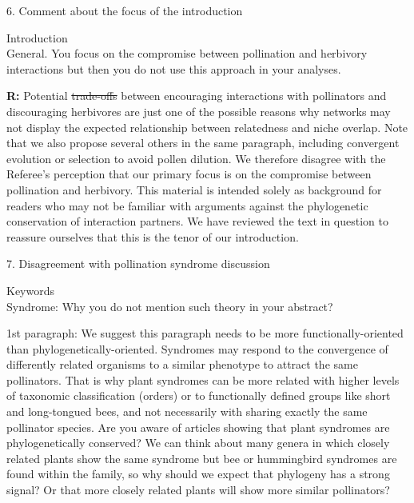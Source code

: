 \documentclass[12pt]{letter}
\newenvironment{refquote}{\bigskip \begin{it}}{\end{it}\smallskip}
\providecommand{\DIFadd}[1]{{\protect\color{blue}\uwave{#1}}} %
\providecommand{\DIFdel}[1]{{\protect\color{red}\sout{#1}}}                      %
\providecommand{\DIFaddbegin}{} %
\providecommand{\DIFaddend}{} %
\providecommand{\DIFdelbegin}{} %
\providecommand{\DIFdelend}{} %
\newcommand{\DIFscaledelfig}{0.5}
\newlength{\DIFdelgraphicswidth} %
\newlength{\DIFdelgraphicsheight} %
\newcommand{\DIFaddincludegraphics}[2][]{{\color{blue}\fbox{\DIFOincludegraphics[#1]{#2}}}} %
\newcommand{\DIFdelincludegraphics}[2][]{%
\sbox{\DIFdelgraphicsbox}{\DIFOincludegraphics[#1]{#2}}%
\settoboxwidth{\DIFdelgraphicswidth}{\DIFdelgraphicsbox} %
\settoboxtotalheight{\DIFdelgraphicsheight}{\DIFdelgraphicsbox} %
\scalebox{\DIFscaledelfig}{%
\parbox[b]{\DIFdelgraphicswidth}{\usebox{\DIFdelgraphicsbox}\\[-\baselineskip] \rule{\DIFdelgraphicswidth}{0em}}\llap{\resizebox{\DIFdelgraphicswidth}{\DIFdelgraphicsheight}{%
\setlength{\unitlength}{\DIFdelgraphicswidth}%
\begin{picture}(1,1)%
\thicklines\linethickness{2pt} %
{\color[rgb]{1,0,0}\put(0,0){\framebox(1,1){}}}%
{\color[rgb]{1,0,0}\put(0,0){\line( 1,1){1}}}%
{\color[rgb]{1,0,0}\put(0,1){\line(1,-1){1}}}%
\end{picture}%
}\hspace*{3pt}}} %
} %
\DeclareRobustCommand{\DIFaddbegin}{\DIFOaddbegin \let\includegraphics\DIFaddincludegraphics} %
\DeclareRobustCommand{\DIFaddend}{\DIFOaddend \let\includegraphics\DIFOincludegraphics} %
\DeclareRobustCommand{\DIFdelbegin}{\DIFOdelbegin \let\includegraphics\DIFdelincludegraphics} %
\DeclareRobustCommand{\DIFdelend}{\DIFOaddend \let\includegraphics\DIFOincludegraphics} %
\begin{document}
	6. Comment about the focus of the introduction


		\begin{refquote}
		Introduction\\
		General. You focus on the compromise between pollination and herbivory interactions but then you do not use this approach in your analyses.
		\end{refquote}


		\textbf{R:} Potential \DIFdelbegin \DIFdel{trade-offs }\DIFdelend \DIFaddbegin \DIFadd{tradeoffs }\DIFaddend between encouraging interactions with pollinators and discouraging herbivores are just one of the possible reasons why networks may not display the expected relationship between relatedness and niche overlap. Note that we also propose several others in the same paragraph, including convergent evolution or selection to avoid pollen dilution. We therefore disagree with the Referee's perception that our primary focus is on the compromise between pollination and herbivory. This material is intended solely as background for readers who may not be familiar with arguments against the phylogenetic conservation of interaction partners. We have reviewed the text in question to reassure ourselves that this is the tenor of our introduction.


	7. Disagreement with pollination syndrome discussion

		\begin{refquote}
		Keywords\\
		Syndrome:  Why you do not mention such theory in your abstract?
		\end{refquote}


		\begin{refquote}
			1st paragraph: We suggest this paragraph needs to be more functionally-oriented than phylogenetically-oriented. Syndromes may respond to the convergence of differently related organisms to a similar phenotype to attract the same pollinators. That is why plant syndromes can be more related with higher levels of taxonomic classification (orders) or to functionally defined groups like short and long-tongued bees, and not necessarily with sharing exactly the same pollinator species. Are you aware of articles showing that plant syndromes are phylogenetically conserved? We can think about many genera in which closely related plants show the same syndrome but bee or hummingbird syndromes are found within the family, so why should we expect that phylogeny has a strong signal? Or that more closely related plants will show more similar pollinators?
		\end{refquote}
\end{document}

